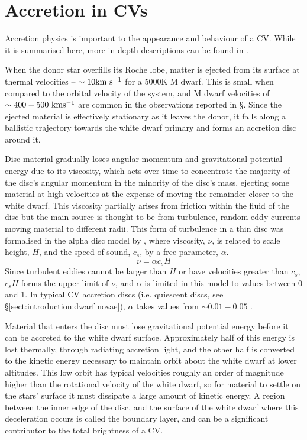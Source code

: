 \section{Accretion in CVs}
\label{sect:introduction:accretion}
Accretion physics is important to the appearance and behaviour of a CV. While it is summarised here, more in-depth descriptions can be found in \citet{warner1995, hellier2001, ritter2010}.

When the donor star overfills its Roche lobe, matter is ejected from its surface at thermal velocities -- $\sim 10 \rm km\ s^{-1}$ for a 5000K M dwarf. This is small when compared to the orbital velocity of the system, and M dwarf velocities of $\sim 400-500 \rm\ km s^{-1}$ are common in the observations reported in \S{}. Since the ejected material is effectively stationary as it leaves the donor, it falls along a ballistic trajectory towards the white dwarf primary and forms an accretion disc around it. 

Disc material gradually loses angular momentum and gravitational potential energy due to its viscosity, which acts over time to concentrate the majority of the disc's angular momentum in the minority of the disc's mass, ejecting some material at high velocities at the expense of moving the remainder closer to the white dwarf. This viscosity partially arises from friction within the fluid of the disc but the main source is thought to be from turbulence, random eddy currents moving material to different radii. This form of turbulence in a thin disc was formalised in the alpha disc model by \citet{shakura1973}, where viscosity, $\nu$, is related to scale height, $H$, and the speed of sound, $c_s$, by a free parameter, $\alpha$.
\begin{equation}
    \label{eqn:disc viscocity}
    \nu = \alpha c_s H
\end{equation}
Since turbulent eddies cannot be larger than $H$ or have velocities greater than $c_s$, $c_s H$ forms the upper limit of $\nu$, and $\alpha$ is limited in this model to values between 0 and 1. In typical CV accretion discs (i.e. quiescent discs, see \S\ref{sect:introduction:dwarf novae}), $\alpha$ takes values from $\sim 0.01 - 0.05$ \citet{hellier2001}.

Material that enters the disc must lose gravitational potential energy before it can be accreted to the white dwarf surface. Approximately half of this energy is lost thermally, through radiating accretion light, and the other half is converted to the kinetic energy necessary to maintain orbit about the white dwarf at lower altitudes. This low orbit has typical velocities roughly an order of magnitude higher than the rotational velocity of the white dwarf, so for material to settle on the stars' surface it must dissipate a large amount of kinetic energy. A region between the inner edge of the disc, and the surface of the white dwarf where this deceleration occurs is called the boundary layer, and can be a significant contributor to the total brightness of a CV. 

